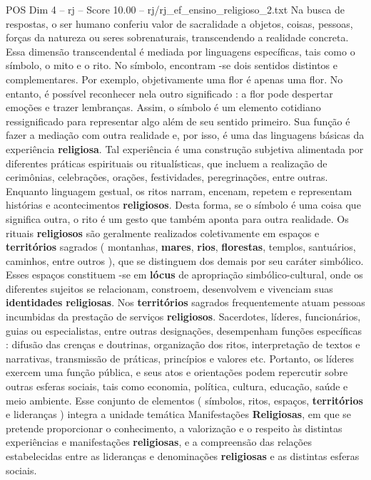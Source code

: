 \begin{textsample}{POS Dim 4 – rj – Score 10.00 – rj/rj\_ef\_ensino\_religioso\_2.txt}
Na busca de respostas, o ser humano conferiu valor de sacralidade a objetos, coisas, pessoas, forças da natureza ou seres sobrenaturais, transcendendo a realidade concreta.
Essa dimensão transcendental é mediada por linguagens específicas, tais como o símbolo, o mito e o rito.
No símbolo, encontram -se dois sentidos distintos e complementares.
Por exemplo, objetivamente uma flor é apenas uma flor.
No entanto, é possível reconhecer nela outro significado : a flor pode despertar emoções e trazer lembranças.
Assim, o símbolo é um elemento cotidiano ressignificado para representar algo além de seu sentido primeiro.
Sua função é fazer a mediação com outra realidade e, por isso, é uma das linguagens básicas da experiência \textbf{religiosa}.
Tal experiência é uma construção subjetiva alimentada por diferentes práticas espirituais ou ritualísticas, que incluem a realização de cerimônias, celebrações, orações, festividades, peregrinações, entre outras.
Enquanto linguagem gestual, os ritos narram, encenam, repetem e representam histórias e acontecimentos \textbf{religiosos}.
Desta forma, se o símbolo é uma coisa que significa outra, o rito é um gesto que também aponta para outra realidade.
Os rituais \textbf{religiosos} são geralmente realizados coletivamente em espaços e \textbf{territórios} sagrados ( montanhas, \textbf{mares}, \textbf{rios}, \textbf{florestas}, templos, santuários, caminhos, entre outros ), que se distinguem dos demais por seu caráter simbólico.
Esses espaços constituem -se em \textbf{lócus} de apropriação simbólico-cultural, onde os diferentes sujeitos se relacionam, constroem, desenvolvem e vivenciam suas \textbf{identidades} \textbf{religiosas}.
Nos \textbf{territórios} sagrados frequentemente atuam pessoas incumbidas da prestação de serviços \textbf{religiosos}.
Sacerdotes, líderes, funcionários, guias ou especialistas, entre outras designações, desempenham funções específicas : difusão das crenças e doutrinas, organização dos ritos, interpretação de textos e narrativas, transmissão de práticas, princípios e valores etc.
Portanto, os líderes exercem uma função pública, e seus atos e orientações podem repercutir sobre outras esferas sociais, tais como economia, política, cultura, educação, saúde e meio ambiente.
Esse conjunto de elementos ( símbolos, ritos, espaços, \textbf{territórios} e lideranças ) integra a unidade temática Manifestações \textbf{Religiosas}, em que se pretende proporcionar o conhecimento, a valorização e o respeito às distintas experiências e manifestações \textbf{religiosas}, e a compreensão das relações estabelecidas entre as lideranças e denominações \textbf{religiosas} e as distintas esferas sociais.

\end{textsample}
